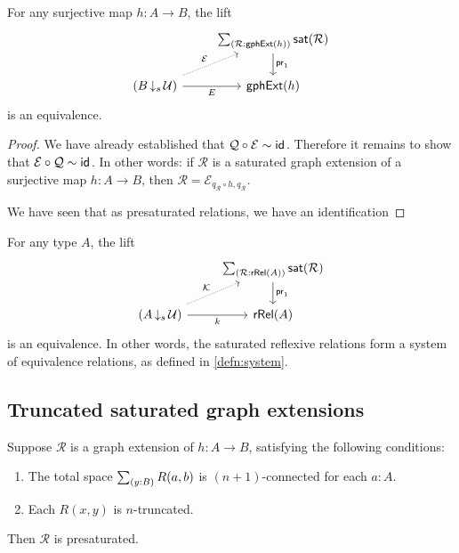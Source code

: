 \begin{thm}
For any surjective map $h:A\to B$, the lift
\begin{equation*}
\begin{tikzcd}
& \sm{\mathcal{R}:\mathsf{gphExt}(h)}\mathsf{sat}(\mathcal{R}) \arrow[d,"\proj 1"] \\
(B\,{\downarrow_s}\,\UU) \arrow[r,swap,"E"] \arrow[ur,densely dotted,"\mathcal{E}"] & \mathsf{gphExt}(h)
\end{tikzcd}
\end{equation*}
is an equivalence.
\end{thm}

\begin{proof}
We have already established that $\mathcal{Q}\circ\mathcal{E}\sim \mathsf{id}_{}$. Therefore it remains to show that $\mathcal{E}\circ \mathcal{Q}\sim\mathsf{id}_{}$. In other words: if $\mathcal{R}$ is a saturated graph extension of a surjective map $h:A\to B$, then $\mathcal{R}=\mathcal{E}_{q_{\mathcal{R}}\circ h,q_{\mathcal{R}}}$. 

We have seen that as presaturated relations, we have an identification
\end{proof}

\begin{cor}
For any type $A$, the lift
\begin{equation*}
\begin{tikzcd}
& \sm{\mathcal{R}:\mathsf{rRel}(A)}\mathsf{sat}(\mathcal{R}) \arrow[d,"\proj 1"] \\
(A\,{\downarrow_s}\,\UU) \arrow[r,swap,"k"] \arrow[ur,densely dotted,"\mathcal{K}"] & \mathsf{rRel}(A)
\end{tikzcd}
\end{equation*}
is an equivalence. In other words, the saturated reflexive relations form a system of equivalence relations, as defined in \cref{defn:system}.
\end{cor}

\subsection{Truncated saturated graph extensions}

\begin{lem}
Suppose $\mathcal{R}$ is a graph extension of $h:A\to B$, satisfying the following conditions:
\begin{enumerate}
\item The total space $\sm{y:B}R(a,b)$ is $(n+1)$-connected for each $a:A$.
\item Each $R(x,y)$ is $n$-truncated.
\end{enumerate}
Then $\mathcal{R}$ is presaturated. 
\end{lem}

